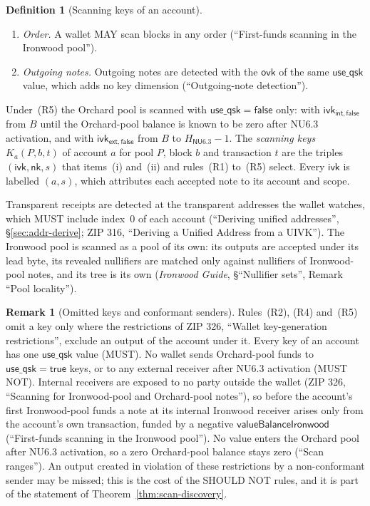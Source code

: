 \documentclass[11pt,a4paper]{article}
\theoremstyle{definition}
\newtheorem{definition}[theorem]{Definition}
\newtheorem{remark}[theorem]{Remark}
\newcommand{\nksym}{\ensuremath{\mathsf{nk}}}
\newcommand{\ivk}{\ensuremath{\mathsf{ivk}}}
\newcommand{\ovk}{\ensuremath{\mathsf{ovk}}}
\begin{document}
\begin{definition}[Scanning keys of an account]
\begin{enumerate}[label=(R\arabic*)]
  at all. For an account with birthday before NU6.3 activation they SHOULD
  NOT be scanned with the external $\mathsf{use\_qsk} = \mathsf{false}$ key
  after NU6.3 activation. If the account's Orchard-pool balance is known to
  be zero at a block at or after NU6.3 activation, they SHOULD NOT be
  scanned in any block that descends from it.
\item \emph{Order.} A wallet MAY scan blocks in any order (``First-funds
  scanning in the Ironwood pool'').
\item \emph{Outgoing notes.} Outgoing notes are detected with the $\ovk$ of
  the same $\mathsf{use\_qsk}$ value, which adds no key dimension
  (``Outgoing-note detection'').
\end{enumerate}
Under~(R5) the Orchard pool is scanned with $\mathsf{use\_qsk} =
\mathsf{false}$ only: with $\ivk_{\mathsf{int},\mathsf{false}}$ from $B$
until the Orchard-pool balance is known to be zero after NU6.3 activation,
and with $\ivk_{\mathsf{ext},\mathsf{false}}$ from $B$ to
$H_{\mathsf{NU6.3}} - 1$. The \emph{scanning keys} $K_a(P, b, t)$ of
account $a$ for pool $P$, block $b$ and transaction $t$ are the triples
$(\ivk, \nksym, s)$ that items~(i) and~(ii) and rules~(R1) to~(R5) select.
Every $\ivk$ is labelled $(a, s)$, which attributes each accepted note to
its account and scope.

Transparent receipts are detected at the transparent addresses the wallet
watches, which MUST include index~$0$ of each account (``Deriving unified
addresses'', \S\ref{sec:addr-derive}; ZIP 316, ``Deriving a Unified Address
from a UIVK''). The Ironwood pool is scanned as a pool of its own: its
outputs are accepted under its lead byte, its revealed nullifiers are
matched only against nullifiers of Ironwood-pool notes, and its tree is its
own (\emph{Ironwood Guide}, \S``Nullifier sets'', Remark ``Pool
locality'').
\end{definition}

\begin{remark}[Omitted keys and conformant senders]
Rules~(R2), (R4) and~(R5) omit a key only where the restrictions of ZIP 326,
``Wallet key-generation restrictions'', exclude an output of the account
under it. Every key of an account has one $\mathsf{use\_qsk}$ value (MUST).
No wallet sends Orchard-pool funds to $\mathsf{use\_qsk} = \mathsf{true}$
keys, or to any external receiver after NU6.3 activation (MUST NOT).
Internal receivers are exposed to no party outside the wallet (ZIP 326,
``Scanning for Ironwood-pool and Orchard-pool notes''), so before the
account's first Ironwood-pool funds a note at its internal Ironwood receiver
arises only from the account's own transaction, funded by a negative
$\mathsf{valueBalanceIronwood}$ (``First-funds scanning in the Ironwood
pool''). No value enters the Orchard pool after NU6.3 activation, so a zero
Orchard-pool balance stays zero (``Scan ranges''). An output created in
violation of these restrictions by a non-conformant sender may be missed;
this is the cost of the SHOULD NOT rules, and it is part of the statement of
Theorem~\ref{thm:scan-discovery}.
\end{remark}
\end{document}
